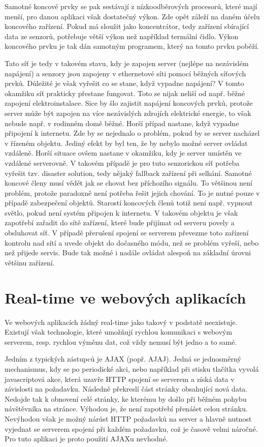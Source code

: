 Samotné koncové prvky se pak sestávají z nízkoodběrových procesorů, které mají menší, pro danou aplikaci však dostatečný výkon. Zde opět záleží na daném účelu koncového zařízení. Pokud má sloužit jako koncentrátor, tedy zařízení sbírající data ze senzorů, potřebuje větší výkon než například termální čidlo. Výkon koncového prvku je tak dán samotným programem, který na tomto prvku poběží.

Tato síť je tedy v takovém stavu, kdy je zapojen server (nejlépe na nezávislém napájení) a senzory jsou zapojeny v ethernetové síti pomocí běžných síťových prvků. Důležité je však vyřešit co se stane, když vypadne napájení? V tomto okamžiku síť prakticky přestane fungovat. Toto se nijak neliší od např. běžné zapojení elektroinstalace. Sice by šlo zajistit napájení koncových prvků, protože server může být zapojen na více nezávislých zdrojích elektrické energie, to však nebude např. v rodinném domě běžné. Horší případ nastane, když vypadne připojení k internetu. Zde by se nejednalo o problém, pokud by se server nacházel v řízeném objektu. Jediný efekt by byl ten, že by nebylo možné server ovládat vzdáleně. Horší situace ovšem nastane v okamžiku, kdy je server umístěn ve vzdálené serverovně. V takovém případě je pro tuto senzorickou síť potřeba vyřešit tzv. disaster solution, tedy nějaký fallback zařízení při selhání. Samotné koncové členy musí vědět jak se chovat bez příchozího signálu. To většinou není problém, protože paradoxně není potřeba řešit jejich chování. To je nutné pouze v případě zabezpečení objektů. Starostí koncových členů totiž není např. vypnout světlo, pokud není systém připojen k internetu. V takovém objektu je však zapotřebí zařadit do sítě zařízení, které bude přijímat od serveru povely a obsluhovat síť. V případě přerušení spojení se serverem převezme toto zařízení kontrolu nad sítí a uvede objekt do dočasného módu, než se problém vyřeší, nebo než přijede servis. Bude tak možné i nadále ovládat alespoň na základní úrovni většinu zařízení.

\section{Real-time ve webových aplikacích}
Ve webových aplikacích žádný real-time jako takový v podstatě neexistuje. Existují však technologie, které umožňují rychlou komunikaci s webovým serverem, resp. rychlou výměnu dat, což vždy nemusí být jedno a to samé.

Jedním z typických zástupců je AJAX (popř. AJAJ). Jedná se jednosměrný mechanismus, kdy se po periodické akci, nebo například při stisku tlačítka vyvolá javascriptová akce, která uzavře HTTP spojení se serverem a získá data v závislosti na požadavku. Následně překreslí část stránky obsahující nová data. Nedojde tak k obnovení celé stránky, ke kterému by došlo při běžném pohybu návštěvníka na stránce. Výhodou je, že není zapotřebí přenášet celou stránku. Nevýhodou však je možný nárůst HTTP požadavků na server a hlavně nutnost vyjednat se serverem spojení při každém požadavku, což je časově velmi náročné. Pro tuto aplikaci je proto použití AJAXu nevhodné.

